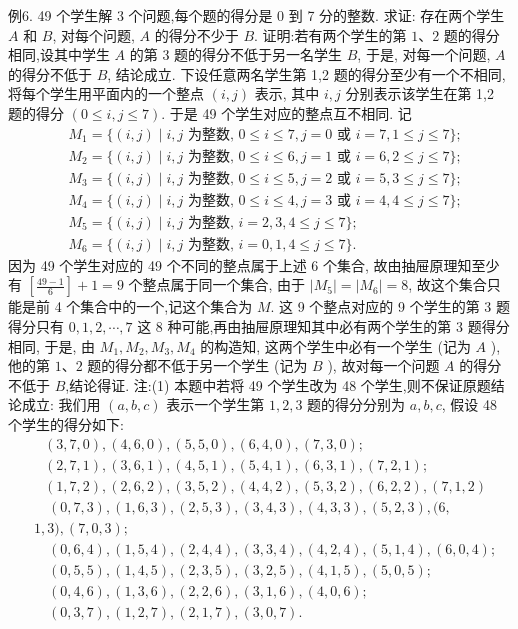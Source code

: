 例6. 49 个学生解 3 个问题,每个题的得分是 0 到 7 分的整数.
求证: 存在两个学生 $A$ 和 $B$, 对每个问题, $A$ 的得分不少于 $B$. 
证明:若有两个学生的第 $1 、 2$ 题的得分相同,设其中学生 $A$ 的第 3 题的得分不低于另一名学生 $B$, 于是, 对每一个问题, $A$ 的得分不低于 $B$, 结论成立.
下设任意两名学生第 1,2 题的得分至少有一个不相同, 将每个学生用平面内的一个整点 $(i, j)$ 表示, 其中 $i, j$ 分别表示该学生在第 1,2 题的得分 $(0 \leqslant i, j \leqslant 7)$. 于是 49 个学生对应的整点互不相同.
记
$$
\begin{aligned}
& M_1=\{(i, j) \mid i, j \text { 为整数, } 0 \leqslant i \leqslant 7, j=0 \text { 或 } i=7,1 \leqslant j \leqslant 7\} ; \\
& M_2=\{(i, j) \mid i, j \text { 为整数, } 0 \leqslant i \leqslant 6, j=1 \text { 或 } i=6,2 \leqslant j \leqslant 7\} ; \\
& M_3=\{(i, j) \mid i, j \text { 为整数, } 0 \leqslant i \leqslant 5, j=2 \text { 或 } i=5,3 \leqslant j \leqslant 7\} ; \\
& M_4=\{(i, j) \mid i, j \text { 为整数, } 0 \leqslant i \leqslant 4, j=3 \text { 或 } i=4,4 \leqslant j \leqslant 7\} ; \\
& M_5=\{(i, j) \mid i, j \text { 为整数, } i=2,3,4 \leqslant j \leqslant 7\} ; \\
& M_6=\{(i, j) \mid i, j \text { 为整数, } i=0,1,4 \leqslant j \leqslant 7\} .
\end{aligned}
$$
因为 49 个学生对应的 49 个不同的整点属于上述 6 个集合, 故由抽屉原理知至少有 $\left[\frac{49-1}{6}\right]+1=9$ 个整点属于同一个集合, 由于 $\left|M_5\right|=\left|M_6\right|=8$, 故这个集合只能是前 4 个集合中的一个,记这个集合为 $M$. 这 9 个整点对应的 9 个学生的第 3 题得分只有 $0,1,2, \cdots, 7$ 这 8 种可能,再由抽屉原理知其中必有两个学生的第 3 题得分相同, 于是, 由 $M_1, M_2, M_3, M_4$ 的构造知, 这两个学生中必有一个学生 (记为 $A$ ), 他的第 $1 、 2$ 题的得分都不低于另一个学生 (记为 $B$ ), 故对每一个问题 $A$ 的得分不低于 $B$,结论得证.
注:(1) 本题中若将 49 个学生改为 48 个学生,则不保证原题结论成立: 我们用 $(a, b, c)$ 表示一个学生第 $1,2,3$ 题的得分分别为 $a, b, c$, 假设 48 个学生的得分如下:
$$
\begin{aligned}
& (3,7,0),(4,6,0),(5,5,0),(6,4,0),(7,3,0) ; \\
& (2,7,1),(3,6,1),(4,5,1),(5,4,1),(6,3,1),(7,2,1) ; \\
& (1,7,2),(2,6,2),(3,5,2),(4,4,2),(5,3,2),(6,2,2),(7,1,2)
\end{aligned}
$$
$$
\begin{aligned}
& \quad(0,7,3),(1,6,3),(2,5,3),(3,4,3),(4,3,3),(5,2,3),(6, \\
& 1,3),(7,0,3) ; \\
& \quad(0,6,4),(1,5,4),(2,4,4),(3,3,4),(4,2,4),(5,1,4),(6,0,4) ; \\
& \quad(0,5,5),(1,4,5),(2,3,5),(3,2,5),(4,1,5),(5,0,5) ; \\
& \quad(0,4,6),(1,3,6),(2,2,6),(3,1,6),(4,0,6) ; \\
& \quad(0,3,7),(1,2,7),(2,1,7),(3,0,7) .
\end{aligned}
$$
